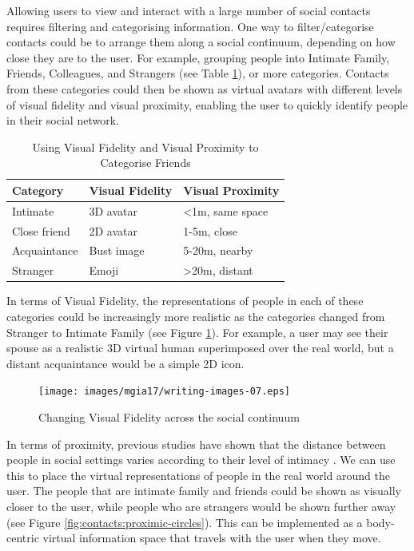 Allowing users to view and interact with a large number of social contacts requires filtering and categorising information. One way to filter/categorise contacts could be to arrange them along a social continuum, depending on how close they are to the user. For example, grouping people into Intimate Family, Friends, Colleagues, and Strangers (see Table \ref{tbl:visual-fidelity-proximity}), or more categories. Contacts from these categories could then be shown as virtual avatars with different levels of visual fidelity and visual proximity, enabling the user to quickly identify people in their social network.

\begin{table}[b]
    \centering
    \caption{Using Visual Fidelity and Visual Proximity to Categorise Friends}
    \label{tbl:visual-fidelity-proximity}
    \begin{tabular}{|l|l|l|}
        \hline
        \textbf{Category} & \textbf{Visual Fidelity}    & \textbf{Visual Proximity}       \\ \hline
        Intimate          & 3D avatar                     & \textless1m, same space  \\ \hline
        Close friend      & 2D avatar                   & 1-5m, close              \\ \hline
        Acquaintance      & Bust image                    & 5-20m, nearby            \\ \hline
        Stranger          & Emoji                        & \textgreater20m, distant \\ \hline
    \end{tabular}
\end{table}


In terms of Visual Fidelity, the representations of people in each of these categories could be increasingly more realistic as the categories changed from Stranger to Intimate Family (see Figure \ref{fig:contacts:visual-fidelity-continuum}). For example, a user may see their spouse as a realistic 3D virtual human superimposed over the real world, but a distant acquaintance would be a simple 2D icon.

\begin{figure}[ht]
    \centering
    \texttt{[image: images/mgia17/writing-images-07.eps]}
    \caption{Changing Visual Fidelity across the social continuum}
    \label{fig:contacts:visual-fidelity-continuum}
\end{figure}

In terms of proximity, previous studies have shown that the distance between people in social settings varies according to their level of intimacy \cite{Anslow2016}. We can use this to place the virtual representations of people in the real world around the user. The people that are intimate family and friends could be shown as visually closer to the user, while people who are strangers would be shown further away (see Figure \ref{fig:contacts:proximic-circles}). This can be implemented as a body-centric virtual information space that travels with the user when they move.

